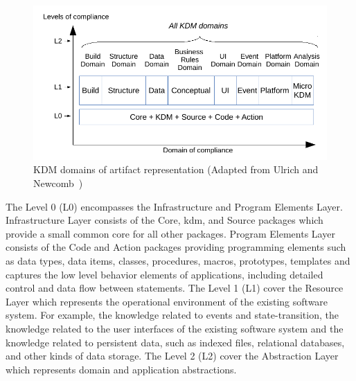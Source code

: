 \documentclass[a4paper,twoside]{article}
\begin{document}
\begin{figure}[!ht]
\centering
  \includegraphics[scale=0.58]{figuras/kdm}
\caption{KDM domains of artifact representation (Adapted from Ulrich and Newcomb~\cite{Ulrich:2010:IST:1841736})}
\label{kdm}
\end{figure}

The Level 0 (L0) encompasses the Infrastructure and Program Elements Layer. Infrastructure Layer consists of the Core, kdm, and Source packages which provide a small common core for all other packages. Program Elements Layer consists of the Code and Action packages providing programming elements such as  data types, data items, classes, procedures, macros, prototypes, templates and captures the low level behavior elements of applications, including detailed control and data flow between statements. The Level 1 (L1) cover the Resource Layer which represents the operational environment of the existing software system. For example, the knowledge related to events and state-transition, the knowledge related to the user interfaces of the existing software system and the knowledge related to persistent data, such as indexed files, relational databases, and other kinds of data storage. The Level 2 (L2) cover the Abstraction Layer which represents domain and application abstractions. 


\end{document}
